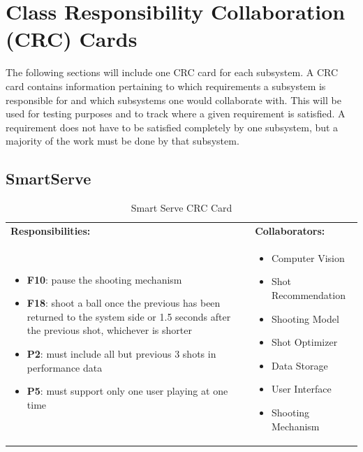 \documentclass[11pt]{article}
\begin{document}
\section{Class Responsibility Collaboration (CRC) Cards}
The following sections will include one CRC card for each subsystem. A CRC card contains information pertaining to which requirements a subsystem is responsible for and which subsystems one would collaborate with. This will be used for testing purposes and to track where a given requirement is satisfied. A requirement does not have to be satisfied completely by one subsystem, but a majority of the work must be done by that subsystem.
\subsection{SmartServe}

\begin{table}[H]
\centering
\label{my-label}
\begin{tabular}{ | >{\raggedright\arraybackslash}p{} | >{\raggedright\arraybackslash}p{} | }
\hline
\multicolumn{2}{|c|}{\textbf{Smart Serve}}             \\ \hline
\textbf{Responsibilities:} & \textbf{Collaborators:} \\ \hline
\begin{itemize}
\item \textbf{F10}: pause the shooting mechanism
\item \textbf{F18}: shoot a ball once the previous has been returned to the system side or 1.5 seconds after the previous shot, whichever is shorter
\item \textbf{P2}:  must include all but previous 3 shots in performance data
\item \textbf{P5}: must support only one user playing at one time
\end{itemize}
&
\begin{itemize}
\item Computer Vision
\item Shot Recommendation
\item Shooting Model
\item Shot Optimizer
\item Data Storage
\item User Interface
\item Shooting Mechanism
\end{itemize} \\ \hline
\end{tabular}
\caption{Smart Serve CRC Card}
\end{table}
\end{document}
